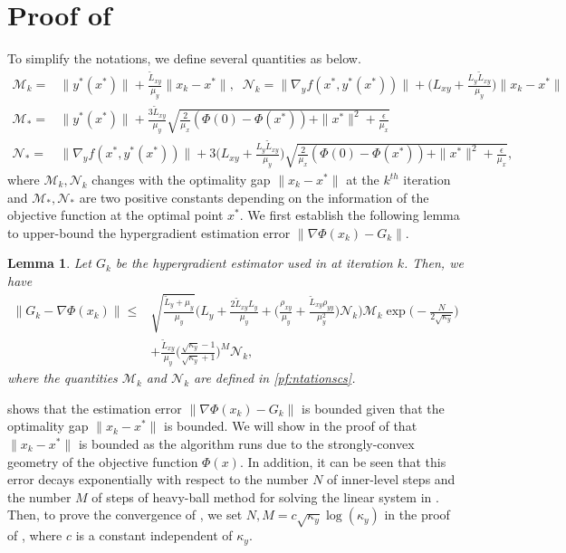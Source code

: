\documentclass{osudissert96}
\newtheorem{lemma}{Lemma}
\begin{document}
\section{Proof of }\label{proof:upss} 
To simplify the notations, we define several quantities as below. 
{\small\begin{align}\label{pf:ntationscs}
\mathcal{M}_k =& \|y^*(x^*)\|+ \frac{\widetilde L_{xy}}{\mu_y}\|x_k-x^*\|, \;\;\mathcal{N}_k = \|\nabla_y f( x^*,y^*(x^*))\|+ \Big(L_{xy}+\frac{L_y\widetilde L_{xy}}{\mu_y}\Big)\|x_k-x^*\| \nonumber
\\\mathcal{M}_* =& \|y^*(x^*)\|+ \frac{3\widetilde L_{xy}}{\mu_y}\sqrt{\frac{2}{\mu_x}(\Phi(0) -\Phi(x^*))+ \|x^*\|^2+\frac{\epsilon}{\mu_x}}
 \nonumber%
\\\mathcal{N}_* =&\|\nabla_y f( x^*,y^*(x^*))\|+ 3\Big(L_{xy}+\frac{L_y\widetilde L_{xy}}{\mu_y}\Big)\sqrt{\frac{2}{\mu_x}(\Phi(0) -\Phi(x^*))+ \|x^*\|^2+\frac{\epsilon}{\mu_x}}, %
\end{align}}
\hspace{-0.12cm}where $\mathcal{M}_k,\mathcal{N}_k$ changes with the optimality gap $\|x_k-x^*\|$ at the $k^{th}$ iteration and $\mathcal{M}_*,\mathcal{N}_*$ are two positive constants depending on the information of the objective function at the optimal point $x^*$.
We first establish the following lemma to 
upper-bound the hypergradient estimation error $\|\nabla\Phi( x_k)-G_k\|$. 
\begin{lemma}\label{le:hgestr}
Let $G_k$ be the hypergradient estimator used in  at iteration $k$. Then, we have 
\begin{align}\label{eq:hgesterr}
\|G_k-\nabla \Phi( x_k)\| \leq &\sqrt{\frac{\widetilde L_y +\mu_y}{\mu_y}} \Big(L_y +\frac{2\widetilde L_{xy}L_y}{\mu_y} +\Big(\frac{\rho_{xy}}{\mu_y}+\frac{\widetilde L_{xy}\rho_{yy}}{\mu_y^2}\Big)\mathcal{N}_k\Big) \mathcal{M}_k \exp\Big(-\frac{N}{2\sqrt{\kappa_y}}\Big) \nonumber
\\&+\frac{\widetilde L_{xy}}{\mu_y}\Big(\frac{\sqrt{\kappa_y}-1}{\sqrt{\kappa_y}+1}\Big)^M\mathcal{N}_k,
\end{align}
where the quantities $\mathcal{M}_k$ and $\mathcal{N}_k$ are defined in \cref{pf:ntationscs}. 
\end{lemma}
 shows that the estimation error $\|\nabla\Phi( x_k)-G_k\|$ is bounded given that the optimality gap $\|x_k-x^*\|$ is bounded. We will show in the proof of  that $\|x_k-x^*\|$ is bounded as the algorithm runs due to the strongly-convex geometry of the objective function $\Phi(x)$. In addition, it can be seen that this error decays exponentially with respect to the number $N$ of inner-level steps and the number $M$ of steps of heavy-ball method for solving the linear system in  . 
Then, to prove the convergence of , we set $N,M=c\sqrt{\kappa_y}\log (\kappa_y)$ in the proof of , where $c$ is a constant independent of $\kappa_y$.
\end{document}
